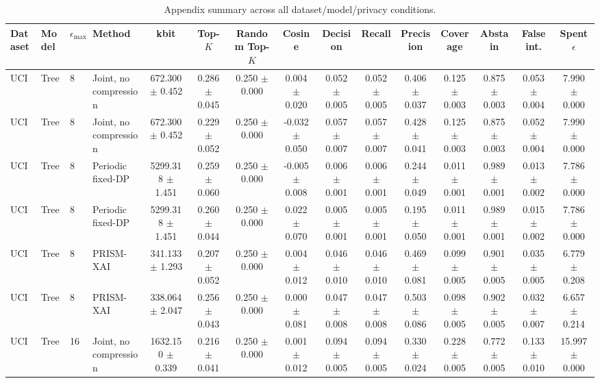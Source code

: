 \begin{table}[t]
\caption{Appendix summary across all dataset/model/privacy conditions.}
\label{tab:appendix-conditions}
\centering
\scriptsize
\setlength{\tabcolsep}{2.5pt}
\begin{tabular}{llllccccccccccc}
\toprule
Dataset & Model & $\epsilon_{\max}$ & Method & kbit & Top-$K$ & Random Top-$K$ & Cosine & Decision & Recall & Precision & Coverage & Abstain & False int. & Spent $\epsilon$ \\
\midrule
UCI & Tree & 8 & Joint, no compression & 672.300 $\pm$ 0.452 & 0.286 $\pm$ 0.045 & 0.250 $\pm$ 0.000 & 0.004 $\pm$ 0.020 & 0.052 $\pm$ 0.005 & 0.052 $\pm$ 0.005 & 0.406 $\pm$ 0.037 & 0.125 $\pm$ 0.003 & 0.875 $\pm$ 0.003 & 0.053 $\pm$ 0.004 & 7.990 $\pm$ 0.000 \\
UCI & Tree & 8 & Joint, no compression & 672.300 $\pm$ 0.452 & 0.229 $\pm$ 0.052 & 0.250 $\pm$ 0.000 & -0.032 $\pm$ 0.050 & 0.057 $\pm$ 0.007 & 0.057 $\pm$ 0.007 & 0.428 $\pm$ 0.041 & 0.125 $\pm$ 0.003 & 0.875 $\pm$ 0.003 & 0.052 $\pm$ 0.004 & 7.990 $\pm$ 0.000 \\
UCI & Tree & 8 & Periodic fixed-DP & 5299.318 $\pm$ 1.451 & 0.259 $\pm$ 0.060 & 0.250 $\pm$ 0.000 & -0.005 $\pm$ 0.008 & 0.006 $\pm$ 0.001 & 0.006 $\pm$ 0.001 & 0.244 $\pm$ 0.049 & 0.011 $\pm$ 0.001 & 0.989 $\pm$ 0.001 & 0.013 $\pm$ 0.002 & 7.786 $\pm$ 0.000 \\
UCI & Tree & 8 & Periodic fixed-DP & 5299.318 $\pm$ 1.451 & 0.260 $\pm$ 0.044 & 0.250 $\pm$ 0.000 & 0.022 $\pm$ 0.070 & 0.005 $\pm$ 0.001 & 0.005 $\pm$ 0.001 & 0.195 $\pm$ 0.050 & 0.011 $\pm$ 0.001 & 0.989 $\pm$ 0.001 & 0.015 $\pm$ 0.002 & 7.786 $\pm$ 0.000 \\
UCI & Tree & 8 & PRISM-XAI & 341.133 $\pm$ 1.293 & 0.207 $\pm$ 0.052 & 0.250 $\pm$ 0.000 & 0.004 $\pm$ 0.012 & 0.046 $\pm$ 0.010 & 0.046 $\pm$ 0.010 & 0.469 $\pm$ 0.081 & 0.099 $\pm$ 0.005 & 0.901 $\pm$ 0.005 & 0.035 $\pm$ 0.005 & 6.779 $\pm$ 0.208 \\
UCI & Tree & 8 & PRISM-XAI & 338.064 $\pm$ 2.047 & 0.256 $\pm$ 0.043 & 0.250 $\pm$ 0.000 & 0.000 $\pm$ 0.081 & 0.047 $\pm$ 0.008 & 0.047 $\pm$ 0.008 & 0.503 $\pm$ 0.086 & 0.098 $\pm$ 0.005 & 0.902 $\pm$ 0.005 & 0.032 $\pm$ 0.007 & 6.657 $\pm$ 0.214 \\
UCI & Tree & 16 & Joint, no compression & 1632.150 $\pm$ 0.339 & 0.216 $\pm$ 0.041 & 0.250 $\pm$ 0.000 & 0.001 $\pm$ 0.012 & 0.094 $\pm$ 0.005 & 0.094 $\pm$ 0.005 & 0.330 $\pm$ 0.024 & 0.228 $\pm$ 0.005 & 0.772 $\pm$ 0.005 & 0.133 $\pm$ 0.010 & 15.997 $\pm$ 0.000 \\

\end{tabular}
\end{table}
